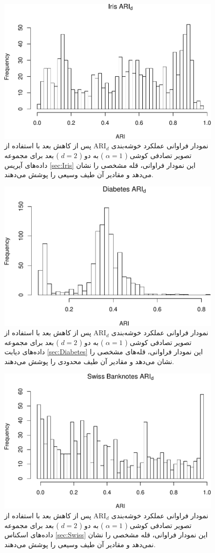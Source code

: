 \begin{figure}[H]
\centering
\includegraphics[width=0.7\linewidth]{Report_files/figure-latex/unnamed-chunk-9-2}
\caption{
نمودار فراوانی عملکرد خوشه‌بندی 
$\mathrm{ARI}_d$
پس از کاهش بعد با استفاده از تصویر تصادفی
کوشی (%
$\alpha=1$%
)
به دو (%
$d=2$%
)
بعد برای مجموعه داده‌های
آیریس
\ref{sec:Iris}
این نمودار فراوانی،
قله
مشخصی را نشان 
می‌دهد
و مقادیر آن طیف 
وسیعی را پوشش می‌دهند.
}
\end{figure}


\begin{figure}[H]
\centering
\includegraphics[width=0.7\linewidth]{Report_files/figure-latex/unnamed-chunk-9-3}
\caption{
نمودار فراوانی عملکرد خوشه‌بندی 
$\mathrm{ARI}_d$
پس از کاهش بعد با استفاده از تصویر تصادفی
کوشی (%
$\alpha=1$%
)
به دو (%
$d=2$%
)
بعد برای مجموعه داده‌های
دیابت
\ref{sec:Diabetes}
این نمودار فراوانی،
قله‌های
مشخصی را نشان 
می‌دهد
و مقادیر آن طیف 
محدودی
 را پوشش می‌دهند.
}
\end{figure}


\begin{figure}[H]
\centering
\includegraphics[width=0.7\linewidth]{Report_files/figure-latex/unnamed-chunk-9-4}
\caption{
نمودار فراوانی عملکرد خوشه‌بندی 
$\mathrm{ARI}_d$
پس از کاهش بعد با استفاده از تصویر تصادفی
کوشی (%
$\alpha=1$%
)
به دو (%
$d=2$%
)
بعد برای مجموعه داده‌های
اسکناس
\ref{sec:Swiss}
این نمودار فراوانی،
قله
مشخصی را نشان 
نمی‌دهد
و مقادیر آن طیف 
وسیعی را پوشش می‌دهند.
}
\end{figure}


